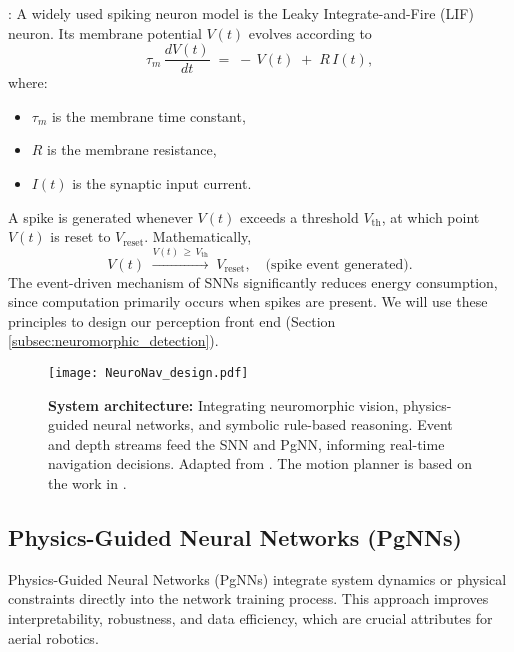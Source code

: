 :
A widely used spiking neuron model is the Leaky Integrate-and-Fire (LIF) neuron. Its membrane potential $V(t)$ evolves according to
\begin{equation}
  \tau_m \,\frac{dV(t)}{dt} \;=\; -\,V(t) \;+\; R\,I(t),
\end{equation}
where:
\begin{itemize}
  \item $\tau_m$ is the membrane time constant,
  \item $R$ is the membrane resistance,
  \item $I(t)$ is the synaptic input current.
\end{itemize}
A spike is generated whenever $V(t)$ exceeds a threshold $V_{\text{th}}$, at which point $V(t)$ is reset to $V_{\text{reset}}$. Mathematically,
\[
V(t) \;\xrightarrow{V(t)\,\ge\,V_{\text{th}}}\; V_{\text{reset}},
\quad
\text{(spike event generated)}.
\]
The event-driven mechanism of SNNs significantly reduces energy consumption, since computation primarily occurs when spikes are present. We will use these principles to design our perception front end (Section \ref{subsec:neuromorphic_detection}).

\begin{figure*}[!t]
    \centering
    \texttt{[image: NeuroNav\_design.pdf]}
    \caption{%
        \textbf{System architecture:} Integrating neuromorphic vision, 
        physics-guided neural networks, and symbolic rule-based reasoning. 
        Event and depth streams feed the SNN and PgNN, informing real-time 
        navigation decisions. Adapted from \cite{evplanner}. The motion planner is based on the work in \cite{mellinger2011minimum}.
    }
    \label{fig:method}
\end{figure*}

\subsection{\textbf{Physics-Guided Neural Networks (PgNNs)}}

Physics-Guided Neural Networks (PgNNs) \cite{raissi2019physics,karniadakis2021physics,NICODEMUS2022331,rampnet,chee2022knode} integrate system dynamics or physical constraints directly into the network training process. This approach improves interpretability, robustness, and data efficiency, which are crucial attributes for aerial robotics.

